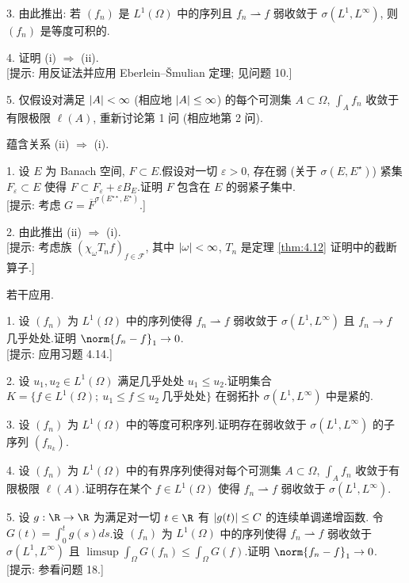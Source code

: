 \begin{problem}[第 3, 4 章]
3. 由此推出: 若 $(f_n)$ 是 $L^1(\Omega)$ 中的序列且 $f_n\rightharpoonup f$ 弱收敛于
$\sigma(L^1,L^\infty)$, 则 $(f_n)$ 是等度可积的.

4. 证明 (i) $\Rightarrow$ (ii).\\
{[提示: 用反证法并应用 Eberlein--Šmulian 定理; 见问题 10.]}

5. 仅假设对满足 $\left|A\right|<\infty$ (相应地 $\left|A\right|\le\infty$) 的每个可测集 $A\subset\Omega$,
$\int_A f_n$ 收敛于有限极限 $\ell(A)$, 重新讨论第 1 问 (相应地第 2 问).


蕴含关系 (ii) $\Rightarrow$ (i).

1. 设 $E$ 为 Banach 空间, $F\subset E$.假设对一切 $\varepsilon>0$, 存在弱
(关于 $\sigma(E,E^\star)$) 紧集 $F_\varepsilon\subset E$ 使得
$F\subset F_\varepsilon+\varepsilon B_E$.证明 $F$ 包含在 $E$ 的弱紧子集中.\\
{[提示: 考虑 $G=\overline F^{\sigma(E^{\star\star},E^\star)}$.]}

2. 由此推出 (ii) $\Rightarrow$ (i).\\
{[提示: 考虑族 $(\chi_\omega T_nf)_{f\in\mathcal{F}}$, 其中 $\left|\omega\right|<\infty$,
$T_n$ 是定理  \ref{thm:4.12} 证明中的截断算子.]}


若干应用.

1. 设 $(f_n)$ 为 $L^1(\Omega)$ 中的序列使得 $f_n\rightharpoonup f$ 弱收敛于
$\sigma(L^1,L^\infty)$ 且 $f_n\to f$ 几乎处处.证明 $\norm{f_n-f}_1\to0$.\\
{[提示: 应用习题 4.14.]}

2. 设 $u_1,u_2\in L^1(\Omega)$ 满足几乎处处 $u_1\le u_2$.证明集合
$K=\{f\in L^1(\Omega);\ u_1\le f\le u_2\ \text{几乎处处}\}$ 在弱拓扑
$\sigma(L^1,L^\infty)$ 中是紧的.

3. 设 $(f_n)$ 为 $L^1(\Omega)$ 中的等度可积序列.证明存在弱收敛于 $\sigma(L^1,L^\infty)$
的子序列 $(f_{n_k})$.

4. 设 $(f_n)$ 为 $L^1(\Omega)$ 中的有界序列使得对每个可测集 $A\subset\Omega$,
$\int_A f_n$ 收敛于有限极限 $\ell(A)$.证明存在某个 $f\in L^1(\Omega)$ 使得
$f_n\rightharpoonup f$ 弱收敛于 $\sigma(L^1,L^\infty)$.

5. 设 $g:\R\to\R$ 为满足对一切 $t\in\R$ 有 $\left|g(t)\right|\le C$ 的连续单调递增函数.
令 $G(t)=\int_0^tg(s)ds$.设 $(f_n)$ 为 $L^1(\Omega)$ 中的序列使得
$f_n\rightharpoonup f$ 弱收敛于 $\sigma(L^1,L^\infty)$ 且
$\limsup\int_\Omega G(f_n)\le\int_\Omega G(f)$.证明 $\norm{f_n-f}_1\to0$.\\
{[提示: 参看问题 18.]}


\end{problem}
